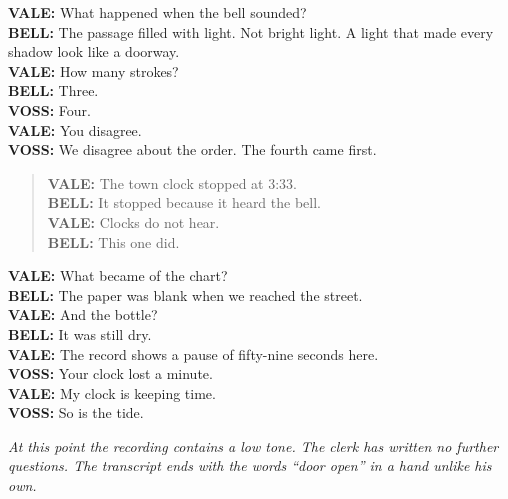 \noindent\textbf{VALE:} What happened when the bell sounded?\\
\textbf{BELL:} The passage filled with light. Not bright light. A light
that made every shadow look like a doorway.\\
\textbf{VALE:} How many strokes?\\
\textbf{BELL:} Three.\\
\textbf{VOSS:} Four.\\
\textbf{VALE:} You disagree.\\
\textbf{VOSS:} We disagree about the order. The fourth came first.

\begin{quote}
\textbf{VALE:} The town clock stopped at 3:33.\\
\textbf{BELL:} It stopped because it heard the bell.\\
\textbf{VALE:} Clocks do not hear.\\
\textbf{BELL:} This one did.
\end{quote}

\textbf{VALE:} What became of the chart?\\
\textbf{BELL:} The paper was blank when we reached the street.\\
\textbf{VALE:} And the bottle?\\
\textbf{BELL:} It was still dry.\\
\textbf{VALE:} The record shows a pause of fifty-nine seconds here.\\
\textbf{VOSS:} Your clock lost a minute.\\
\textbf{VALE:} My clock is keeping time.\\
\textbf{VOSS:} So is the tide.

\medskip
\noindent\textit{At this point the recording contains a low tone. The clerk
has written no further questions. The transcript ends with the words
``door open'' in a hand unlike his own.}
